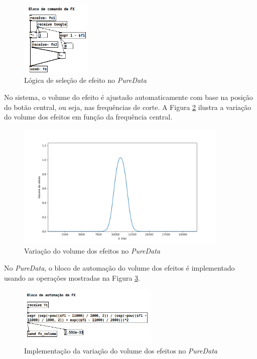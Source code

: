 \begin{figure}[h]
    \centering
    \includegraphics[width=0.3\textwidth]{figuras/fig48.png}
    \caption{Lógica de seleção de efeito no \textit{PureData}}
    \label{fig48}
\end{figure}

No sistema, o volume do efeito é ajustado automaticamente com base na posição do botão central, ou seja, nas frequências de corte. A Figura \ref{fig49} ilustra a variação do volume dos efeitos em função da frequência central.

\begin{figure}[h]
    \centering
    \includegraphics[width=0.9\textwidth]{figuras/fig49.png}
    \caption{Variação do volume dos efeitos no \textit{PureData}}
    \label{fig49}
\end{figure}

No \textit{PureData}, o bloco de automação do volume dos efeitos é implementado usando as operações mostradas na Figura \ref{fig50}.

\begin{figure}[h]
    \centering
    \includegraphics[width=0.6\textwidth]{figuras/fig50.png}
    \caption{Implementação da variação do volume dos efeitos no \textit{PureData}}
    \label{fig50}
\end{figure}

